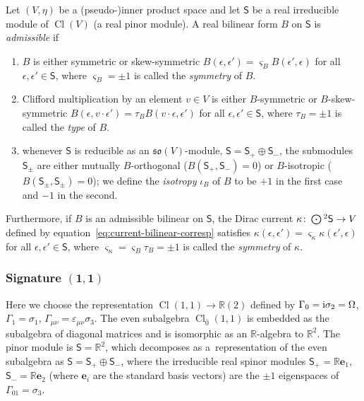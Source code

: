 \documentclass[pdftex]{sigma}
\numberwithin{equation}{section}
\newcommand{\fso}{\mathfrak{so}}
\newcommand{\RR}{\mathbb{R}}
\newcommand{\ssS}{\mathsf{S}}
\newcommand{\Odot}{\mathchoice{{\textstyle\bigodot}}{\bigodot}{\bigodot}{\bigodot}}
\newcommand{\be}{\boldsymbol{e}}
\newcommand{\1}{\mathbbm{1}}
\DeclareMathOperator{\Cl}{Cl}
\begin{document}
\begin{Definition}\label{def:admissible-bilinear}
	Let $(V,\eta)$ be a (pseudo-)inner product space and let $\ssS$ be a real irreducible module of $\Cl(V)$ (a real pinor module). A real bilinear form $B$ on $\ssS$ is \emph{admissible} if
	\begin{enumerate}\itemsep=0pt
		\item $B$ is either symmetric or skew-symmetric
	$B(\epsilon,\epsilon') = \varsigma_B B(\epsilon',\epsilon)
$
			for all $\epsilon,\epsilon'\in\ssS$, where $\varsigma_B=\pm 1$ is called the \emph{symmetry} of $B$.
		\item Clifford multiplication by an element $v\in V$ is either $B$-symmetric or $B$-skew-symmetric
$
				B(\epsilon,v\cdot \epsilon') = \tau_B B(v\cdot\epsilon,\epsilon')
$
			for all $\epsilon,\epsilon'\in\ssS$, where $\tau_B=\pm 1$ is called the \emph{type} of $B$.
		\item whenever $\ssS$ is reducible as an $\fso(V)$-module, $\ssS=\ssS_+\oplus \ssS_-$, the submodules $\ssS_\pm$ are either mutually $B$-orthogonal ($B(\ssS_+,\ssS_-)=0$) or $B$-isotropic ($B(\ssS_\pm,\ssS_\pm)=0$); we define the \emph{isotropy} $\iota_B$ of $B$ to be $+1$ in the first case and $-1$ in the second.%
	\end{enumerate}
	Furthermore, if $B$ is an admissible bilinear on $\ssS$, the Dirac current $\kappa\colon\Odot^2\ssS\to V$ defined by equation~\eqref{eq:current-bilinear-corresp} satisfies
$
		\kappa(\epsilon,\epsilon') = \varsigma_\kappa\kappa(\epsilon',\epsilon)
$
	for all $\epsilon,\epsilon'\in\ssS$, where $\varsigma_\kappa=\varsigma_B\tau_B=\pm 1$ is called the \emph{symmetry} of $\kappa$.
\end{Definition}

\subsubsection[Signature (1,1)]{Signature $\boldsymbol{(1,1)}$}

Here we choose the representation $\Cl(1,1)\to \RR(2)$ defined by
$\Gamma_0 = {\rm i}\sigma_2 = \Omega$,
$ \Gamma_1 = \sigma_1$,
$ \Gamma_{\mu\nu} = \varepsilon_{\mu\nu}\sigma_3$.
The even subalgebra $\Cl_{\bar 0}(1,1)$ is embedded as the subalgebra of diagonal matrices and is isomorphic as an $\RR$-algebra to $\RR^2$. The pinor module is $\ssS=\RR^2$, which decomposes as a~representation of the even subalgebra as $\ssS=\ssS_+\oplus \ssS_-$, where the irreducible real spinor modules $\ssS_+=\RR\be_1$, $\ssS_-=\RR\be_2$ (where $\be_i$ are the standard basis vectors) are the $\pm 1$ eigenspaces of $\Gamma_{01}=\sigma_3$.
\end{document}

